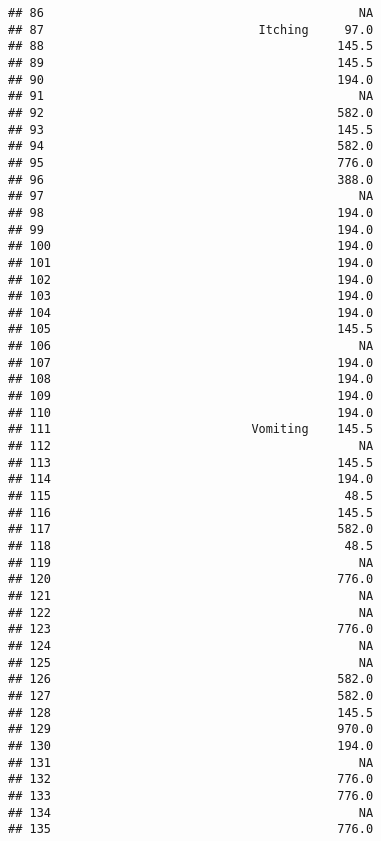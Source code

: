 \documentclass[
]{article}
\begin{document}
\begin{verbatim}
## 86                                            NA
## 87                              Itching     97.0
## 88                                         145.5
## 89                                         145.5
## 90                                         194.0
## 91                                            NA
## 92                                         582.0
## 93                                         145.5
## 94                                         582.0
## 95                                         776.0
## 96                                         388.0
## 97                                            NA
## 98                                         194.0
## 99                                         194.0
## 100                                        194.0
## 101                                        194.0
## 102                                        194.0
## 103                                        194.0
## 104                                        194.0
## 105                                        145.5
## 106                                           NA
## 107                                        194.0
## 108                                        194.0
## 109                                        194.0
## 110                                        194.0
## 111                            Vomiting    145.5
## 112                                           NA
## 113                                        145.5
## 114                                        194.0
## 115                                         48.5
## 116                                        145.5
## 117                                        582.0
## 118                                         48.5
## 119                                           NA
## 120                                        776.0
## 121                                           NA
## 122                                           NA
## 123                                        776.0
## 124                                           NA
## 125                                           NA
## 126                                        582.0
## 127                                        582.0
## 128                                        145.5
## 129                                        970.0
## 130                                        194.0
## 131                                           NA
## 132                                        776.0
## 133                                        776.0
## 134                                           NA
## 135                                        776.0

\end{verbatim}
\end{document}
